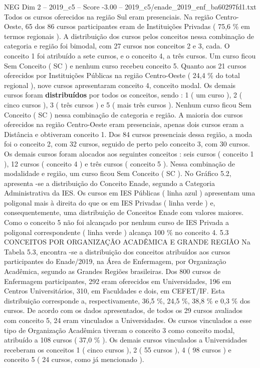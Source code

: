 \begin{textsample}{NEG Dim 2 – 2019\_c5 – Score -3.00 – 2019\_c5/enade\_2019\_enf\_ba60297fd1.txt}
Todos os cursos oferecidos na região Sul eram presenciais.
Na região Centro-Oeste, 65 dos 86 cursos participantes eram de Instituições Privadas ( 75,6 \% em termos regionais ).
A distribuição dos cursos pelos conceitos nessa combinação de categoria e região foi bimodal, com 27 cursos nos conceitos 2 e 3, cada.
O conceito 1 foi atribuído a sete cursos, e o conceito 4, a três cursos.
Um curso ficou Sem Conceito ( SC ) e nenhum curso recebeu conceito 5.
Quanto aos 21 cursos oferecidos por Instituições Públicas na região Centro-Oeste ( 24,4 \% do total regional ), nove cursos apresentaram conceito 4, conceito modal.
Os demais cursos foram \textbf{distribuídos} por todos os conceitos, sendo : 1 ( um curso ), 2 ( cinco cursos ), 3 ( três cursos ) e 5 ( mais três cursos ).
Nenhum curso ficou Sem Conceito ( SC ) nessa combinação de categoria e região.
A maioria dos cursos oferecidos na região Centro-Oeste eram presenciais, apenas dois cursos eram a Distância e obtiveram conceito 1.
Dos 84 cursos presenciais dessa região, a moda foi o conceito 2, com 32 cursos, seguido de perto pelo conceito 3, com 30 cursos.
Os demais cursos foram alocados aos seguintes conceitos : seis cursos ( conceito 1 ), 12 cursos ( conceito 4 ) e três cursos ( conceito 5 ).
Nessa combinação de modalidade e região, um curso ficou Sem Conceito ( SC ).
No Gráfico 5.2, apresenta -se a distribuição do Conceito Enade, segundo a Categoria Administrativa da IES.
Os cursos em IES Públicas ( linha azul ) apresentam uma poligonal mais à direita do que os em IES Privadas ( linha verde ) e, consequentemente, uma distribuição de Conceitos Enade com valores maiores.
Como o conceito 5 não foi alcançado por nenhum curso de IES Privada a poligonal correspondente ( linha verde ) alcança 100 \% no conceito 4. 5.3 CONCEITOS POR ORGANIZAÇÃO ACADÊMICA E GRANDE REGIÃO Na Tabela 5.3, encontra -se a distribuição dos conceitos atribuídos aos cursos participantes do Enade/2019, na Área de Enfermagem, por Organização Acadêmica, segundo as Grandes Regiões brasileiras.
Dos 800 cursos de Enfermagem participantes, 292 eram oferecidos em Universidades, 196 em Centros Universitários, 310, em Faculdades e dois, em CEFET/IF.
Esta distribuição corresponde a, respectivamente, 36,5 \%, 24,5 \%, 38,8 \% e 0,3 \% dos cursos.
De acordo com os dados apresentados, de todos os 29 cursos avaliados com conceito 5, 24 eram vinculados a Universidades.
Os cursos vinculados a esse tipo de Organização Acadêmica tiveram o conceito 3 como conceito modal, atribuído a 108 cursos ( 37,0 \% ).
Os demais cursos vinculados a Universidades receberam os conceitos 1 ( cinco cursos ), 2 ( 55 cursos ), 4 ( 98 cursos ) e conceito 5 ( 24 cursos, como já mencionado ).

\end{textsample}
